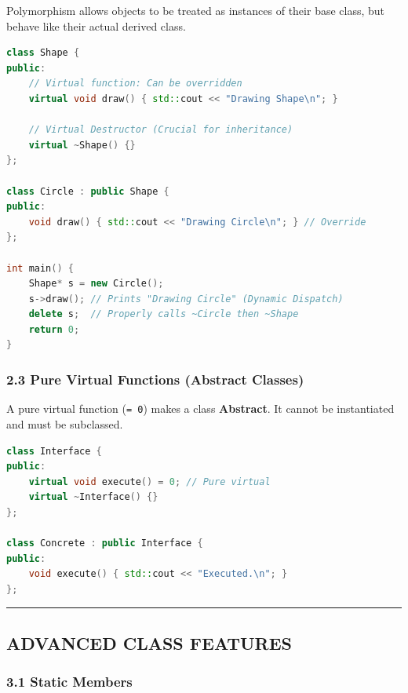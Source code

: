 Polymorphism allows objects to be treated as instances of their base
class, but behave like their actual derived class.

\begin{lstlisting}[language={C++}]
class Shape {
public:
    // Virtual function: Can be overridden
    virtual void draw() { std::cout << "Drawing Shape\n"; }

    // Virtual Destructor (Crucial for inheritance)
    virtual ~Shape() {}
};

class Circle : public Shape {
public:
    void draw() { std::cout << "Drawing Circle\n"; } // Override
};

int main() {
    Shape* s = new Circle();
    s->draw(); // Prints "Drawing Circle" (Dynamic Dispatch)
    delete s;  // Properly calls ~Circle then ~Shape
    return 0;
}
\end{lstlisting}

\hypertarget{pure-virtual-functions-abstract-classes}{%
\subsubsection{2.3 Pure Virtual Functions (Abstract
Classes)}\label{pure-virtual-functions-abstract-classes}}

A pure virtual function (\passthrough{\lstinline!= 0!}) makes a class
\textbf{Abstract}. It cannot be instantiated and must be subclassed.

\begin{lstlisting}[language={C++}]
class Interface {
public:
    virtual void execute() = 0; // Pure virtual
    virtual ~Interface() {}
};

class Concrete : public Interface {
public:
    void execute() { std::cout << "Executed.\n"; }
};
\end{lstlisting}

\begin{center}\rule{0.5\linewidth}{0.5pt}\end{center}

\hypertarget{advanced-class-features}{%
\subsection{ADVANCED CLASS FEATURES}\label{advanced-class-features}}

\hypertarget{static-members}{%
\subsubsection{3.1 Static Members}\label{static-members}}

